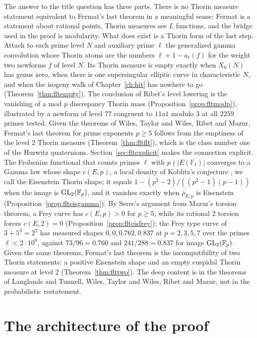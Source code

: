 The answer to the title question has three parts. There is no Thorin measure statement equivalent to Fermat's last theorem in a meaningful sense: Fermat is a statement about rational points, Thorin measures see $L$ functions, and the bridge used in the proof is modularity. What does exist is a Thorin form of the last step. Attach to each prime level $N$ and auxiliary prime $\ell$ the generalized gamma convolution whose Thorin atoms are the numbers $\ell+1-a_\ell(f)$ for the weight two newforms $f$ of level $N$. Its Thorin measure is empty exactly when $X_0(N)$ has genus zero, when there is one supersingular elliptic curve in characteristic $N$, and when the isogeny walk of Chapter~\ref{ch:hit} has nowhere to go (Theorem~\ref{thm:fltempty}). The conclusion of Ribet's level lowering is the vanishing of a mod $p$ discrepancy Thorin mass (Proposition~\ref{prop:fltmodp}), illustrated by a newform of level $77$ congruent to $11a1$ modulo $3$ at all $2259$ primes tested. Given the theorems of Wiles, Taylor and Wiles, Ribet and Mazur, Fermat's last theorem for prime exponents $p\ge5$ follows from the emptiness of the level $2$ Thorin measure (Theorem~\ref{thm:fltflt}), which is the class number one of the Hurwitz quaternions. Section~\ref{sec:fltexplicit} makes the connection explicit. The Frobenius functional that counts primes $\ell$ with $p\nmid|E(\mathbb F_\ell)|$ converges to a Gamma law whose shape $c(E,p)$, a local density of Koblitz's conjecture \cite{koblitz1988,zywina2011}, we call the Eisenstein Thorin shape; it equals $1-(p^2-2)/((p^2-1)(p-1))$ when the image is $\mathrm{GL}_2(\mathbb F_p)$, and it vanishes exactly when $\bar\rho_{E,p}$ is Eisenstein (Proposition~\ref{prop:flteisgamma}). By Serre's argument from Mazur's torsion theorem, a Frey curve has $c(E,p)>0$ for $p\ge5$, while its rational $2$ torsion forces $c(E,2)=0$ (Proposition~\ref{prop:flteisfrey}); the Frey type curve of $3+5^3=2^7$ has measured shapes $0,0,0.762,0.837$ at $p=2,3,5,7$ over the primes $\ell<2\cdot10^6$, against $73/96=0.760$ and $241/288=0.837$ for image $\mathrm{GL}_2(\mathbb F_p)$. Given the same theorems, Fermat's last theorem is the incompatibility of two Thorin statements: a positive Eisenstein shape and an empty cuspidal Thorin measure at level $2$ (Theorem~\ref{thm:flttwo}). The deep content is in the theorems of Langlands and Tunnell, Wiles, Taylor and Wiles, Ribet and Mazur, not in the probabilistic restatement.

\section{The architecture of the proof}\label{sec:fltproof}

